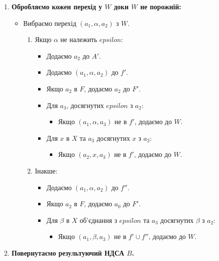 \documentclass[12pt,a4paper]{article}
\begin{document}
\begin{enumerate}
    \item \textbf{Обробляємо кожен перехід у \( W \) доки \( W \) не порожній:}
    \begin{itemize}
        \item Вибраємо перехід \( (a_1, \alpha, a_2) \) з \( W \).
        \begin{enumerate}
            \item Якщо \( \alpha \) не належить \( epsilon \):
            \begin{itemize}
                \item Додаємо \( a_2 \) до \( A' \).
                \item Додаємо \( (a_1, \alpha, a_2) \) до \( f' \).
                \item Якщо \( a_2 \) в \( F \), додаємо \( a_2 \) до \( F' \).
                \item Для \( a_3 \), досягнутих \( epsilon \) з \( a_2 \):
                \begin{itemize}
                    \item Якщо \( (a_1, \alpha, a_3) \) не в \( f' \), додаємо до \( W \).
                \end{itemize}
                \item Для \( x \) в \( X \) та \( a_3 \) досягнутих \( x \) з \( a_2 \):
                \begin{itemize}
                    \item Якщо \( (a_2, x, a_3) \) не в \( f' \), додаємо до \( W \).
                \end{itemize}
            \end{itemize}
            \item Інакше:
            \begin{itemize}
                \item Додаємо \( (a_1, \alpha, a_2) \) до \( f'' \).
                \item Якщо \( a_2 \) в \( F \), додаємо \( a_0 \) до \( F' \).
                \item Для \( \beta \) в \( X \) об'єднання з \( epsilon \) та \( a_3 \) досягнутих \( \beta \) з \( a_2 \):
                \begin{itemize}
                    \item Якщо \( (a_1, \beta, a_3) \) не в \( f' \cup f'' \), додаємо до \( W \).
                \end{itemize}
            \end{itemize}
        \end{enumerate}
    \end{itemize}

    \item \textbf{Повернутаємо результуючий НДСА \( B \).}
\end{enumerate}
\end{document}
